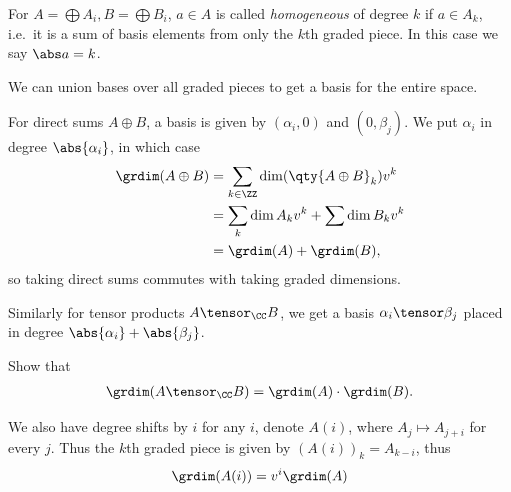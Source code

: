 \begin{definition}

For \(A = \bigoplus A_i, B = \bigoplus B_i\), \(a\in A\) is called
\emph{homogeneous} of degree \(k\) if \(a\in A_k\), i.e.~it is a sum of
basis elements from only the \(k\)th graded piece. In this case we say
\(\abs a = k\).

\end{definition}

\begin{proposition}

We can union bases over all graded pieces to get a basis for the entire
space.

For direct sums \(A\oplus B\), a basis is given by \((\alpha_i, 0)\) and
\((0, \beta_j)\). We put \(\alpha_i\) in degree \(\abs{\alpha_i}\), in
which case
\begin{align*}
\grdim(A\oplus B) 
&= \sum_{k\in \ZZ} \dim(\qty{A\oplus B}_k) v^k \\
&= \sum_k \dim A_k v^k + \sum \dim B_k v^k \\
&= \grdim(A) + \grdim(B)
,\end{align*} so taking direct sums commutes with taking graded
dimensions.

Similarly for tensor products \(A\tensor_\CC B\), we get a basis
\(\alpha_i \tensor \beta_j\) placed in degree
\(\abs{\alpha_i} + \abs{\beta_j}\).

\end{proposition}

\begin{exercise}[?]

Show that
\begin{align*}
\grdim(A\tensor_\CC B) = \grdim(A) \cdot \grdim(B)
.\end{align*}

\end{exercise}

We also have degree shifts by \(i\) for any \(i\), denote \(A(i)\),
where \(A_j \mapsto A_{j+i}\) for every \(j\). Thus the \(k\)th graded
piece is given by \((A(i))_k = A_{k-i}\), thus
\begin{align*}
\grdim(A(i)) = v^i \grdim(A)
\end{align*}

